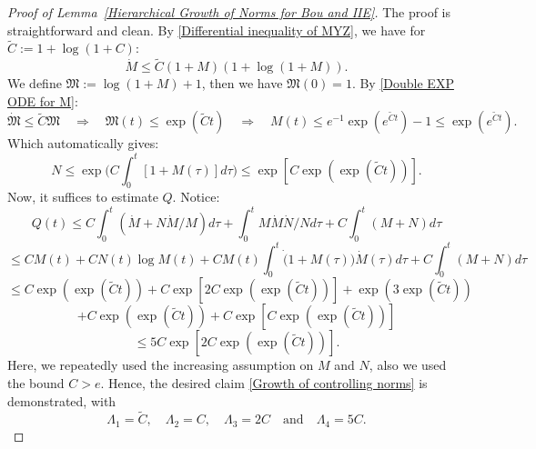 \documentclass[12pt,letterpaper]{article}
\theoremstyle{plain}
\begin{document}
\begin{proof}[Proof of Lemma~\ref{Hierarchical Growth of Norms for Bou and IIE}]
 The proof is straightforward and clean. By \eqref{Differential inequality of MYZ}, we have for $\tilde C:=1+\log(1+C)$:
 \begin{equation}\label{Double EXP ODE for M}
  \dot M\le \tilde C(1+M)(1+\log (1+M)) . 
 \end{equation}
We define $\mathfrak M:=\log(1+M)+1$, then we have $\mathfrak M(0)=1$. By \eqref{Double EXP ODE for M}:
\begin{equation*}
 \dot{\mathfrak M}\le \tilde C\mathfrak M\quad\Longrightarrow\quad \mathfrak M(t)\le \exp(\tilde Ct)  \quad\Longrightarrow \quad M(t)\le e^{-1}\exp(e^{\tilde Ct})-1\le\exp(e^{\tilde Ct}).
\end{equation*}
Which automatically gives:
 \begin{equation*}
   N\le \exp\bigg( C\int_0^t[1+M(\tau)]d\tau\bigg)\le  \exp[C\exp(\exp(\tilde Ct))].
 \end{equation*}
 Now, it suffices to estimate $Q$. Notice:
 \begin{equation*}
 Q(t)\le C\int_0^t(\dot M+N\dot M/M) d\tau+\int_0^t M\dot M\dot N/N d\tau+C\int_0^t(M+N) d\tau   
 \end{equation*}
 \begin{equation*}
  \le    CM(t)+CN(t) \log M(t)+ CM(t)\int_0^t \dot (1+M(\tau))\dot M(\tau)d\tau+C\int_0^t(M+N)d\tau
 \end{equation*}
 \begin{equation*}
  \le  C\exp(\exp(\tilde Ct))+C\exp[2C\exp(\exp(\tilde Ct))] + \exp(3\exp(\tilde Ct))
 \end{equation*}
 \begin{equation*}
   +C\exp(\exp(\tilde Ct))+C\exp[C\exp(\exp(\tilde Ct))]  
 \end{equation*}
 \begin{equation*}
  \le    5C\exp[2C\exp(\exp(\tilde Ct))].
 \end{equation*}
 Here, we repeatedly used the increasing assumption on $M$ and $N$, also we used the bound $C>e$. Hence, the desired claim \eqref{Growth of controlling norms} is demonstrated, with
 \begin{equation*}
   \Lambda_1=\tilde C,\quad\Lambda_2=C,\quad \Lambda_3=2C\quad\text{and}\quad\Lambda_4=5C.  
 \end{equation*}
\end{proof}
\end{document}
